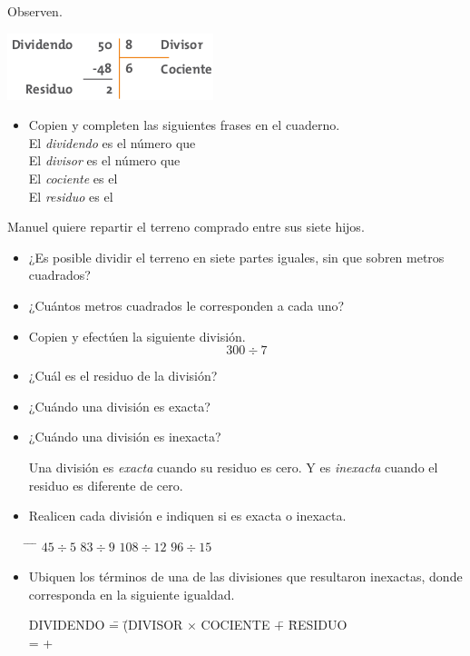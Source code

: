 \documentclass[letterpaper,11pt,twoside]{article}
\begin{document}
\begin{multicols}{2}
Observen.
\begin{center}
\includegraphics[scale=.75]{Images/dividendo.png} 
\end{center}
\begin{itemize}
\item Copien y completen las siguientes frases en el cuaderno.\\
El \emph{dividendo} es el número que \hrulefill\\
El \emph{divisor} es el número que \hrulefill\\
El \emph{cociente} es el \hrulefill\\
El \emph{residuo} es el \hrulefill
\end{itemize}
Manuel quiere repartir el terreno comprado entre sus siete hijos.
\begin{itemize}
\item ¿Es posible dividir el terreno en siete partes iguales, sin que sobren metros cuadrados?
\item ¿Cuántos metros cuadrados le corresponden a cada uno?
\item Copien y efectúen la siguiente división.
\[300\div7\]
\item ¿Cuál es el residuo de la división?
\item ¿Cuándo una división es exacta?
\item ¿Cuándo una división es inexacta?

Una división es \emph{exacta} cuando su residuo es cero. Y es \emph{inexacta} cuando el residuo es diferente de cero.
\item Realicen cada división e indiquen si es exacta o
inexacta.
\begin{tabbing}
\hspace{2cm} \= \hspace{2cm} \= \hspace{2cm} \= \kill
$45\div 5$ \> $83\div 9$ \> $108\div 12$ \> $96\div 15$ 
\end{tabbing}
\item Ubiquen los términos de una de las divisiones que resultaron inexactas, donde corresponda en la siguiente igualdad.
\begin{tabbing}
DIVIDENDO \= = \= (DIVISOR $\times$ COCIENTE \= + \= RESIDUO\\
\fbox{\hspace{2cm}} \> = \> \fbox{\hspace{1cm}$\times$\hspace{1cm}} \> + \> \fbox{\hspace{1cm}} 
\end{tabbing} 
\end{itemize}
\end{multicols}
\end{document}
